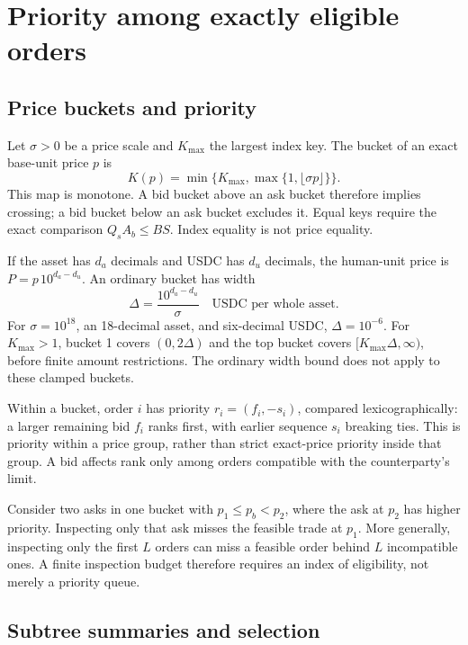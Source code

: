 \section{Priority among exactly eligible orders}

\subsection{Price buckets and priority}

Let $\sigma>0$ be a price scale and $K_{\max}$ the largest index key. The bucket of an exact
base-unit price $p$ is
\begin{equation}
 K(p)=\min\{K_{\max},\max\{1,\lfloor\sigma p\rfloor\}\}.
 \label{eq:bucket}
\end{equation}
This map is monotone. A bid bucket above an ask bucket therefore implies crossing; a bid
bucket below an ask bucket excludes it. Equal keys require the exact comparison
$Q_sA_b\le BS$. Index equality is not price equality.

If the asset has $d_a$ decimals and USDC has $d_u$ decimals, the human-unit price is
$P=p\,10^{d_a-d_u}$. An ordinary bucket has width
\begin{equation}
 \Delta=\frac{10^{d_a-d_u}}{\sigma}
 \quad\text{USDC per whole asset}.
\end{equation}
For $\sigma=10^{18}$, an 18-decimal asset, and six-decimal USDC, $\Delta=10^{-6}$.
For $K_{\max}>1$, bucket 1 covers $(0,2\Delta)$ and the top bucket covers
$[K_{\max}\Delta,\infty)$, before finite amount restrictions. The ordinary width bound
does not apply to these clamped buckets.

Within a bucket, order $i$ has priority $r_i=(f_i,-s_i)$, compared lexicographically:
a larger remaining bid $f_i$ ranks first, with earlier sequence $s_i$ breaking ties.
This is priority within a price group, rather than strict exact-price priority inside that
group. A bid affects rank only among orders compatible with the counterparty's limit.

Consider two asks in one bucket with $p_1\le p_b<p_2$, where the ask at $p_2$ has higher
priority. Inspecting only that ask misses the feasible trade at $p_1$. More generally,
inspecting only the first $L$ orders can miss a feasible order behind $L$ incompatible
ones. A finite inspection budget therefore requires an index of eligibility, not merely
a priority queue.

\subsection{Subtree summaries and selection}

